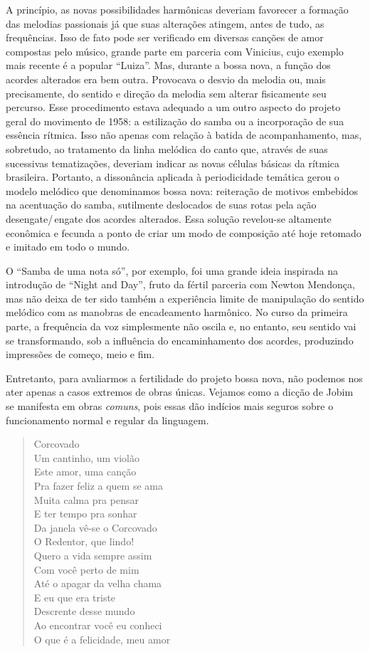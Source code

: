 A princípio, as novas possibilidades harmônicas deveriam favorecer a
formação das melodias passionais já que suas alterações atingem, antes
de tudo, as frequências. Isso de fato pode ser verificado em diversas
canções de amor compostas pelo músico, grande parte em parceria com
Vinicius, cujo exemplo mais recente é a popular ``Luiza''. Mas, durante a bossa nova, a função dos acordes alterados era
bem outra. Provocava o desvio da melodia ou, mais precisamente, do
sentido e direção da melodia sem alterar fisicamente seu percurso.
Esse procedimento estava adequado a um outro aspecto do projeto geral do
movimento de 1958: a estilização do samba ou a incorporação de sua
essência rítmica. Isso não apenas com relação à batida de
acompanhamento, mas, sobretudo, ao tratamento da linha melódica do canto
que, através de suas sucessivas tematizações, deveriam indicar as novas
células básicas da rítmica brasileira. Portanto, a dissonância aplicada
à periodicidade temática gerou o modelo melódico que denominamos bossa
nova: reiteração de motivos embebidos na acentuação do samba, sutilmente
deslocados de suas rotas pela ação desengate/\,engate dos acordes
alterados. Essa solução revelou-se altamente econômica e fecunda a ponto
de criar um modo de composição até hoje retomado e imitado em todo o
mundo.

O ``Samba de uma nota só'', por exemplo, foi uma grande ideia inspirada na
introdução de ``Night and Day'', fruto da fértil parceria com Newton
Mendonça, mas não deixa de ter sido também a experiência limite de
manipulação do sentido melódico com as manobras de encadeamento
harmônico. No curso da primeira parte, a frequência da voz simplesmente
não oscila e, no entanto, seu sentido vai se transformando, sob a
influência do encaminhamento dos acordes, produzindo impressões de
começo, meio e fim.

Entretanto, para avaliarmos a fertilidade do projeto bossa nova, não
podemos nos ater apenas a casos extremos de obras únicas. Vejamos como a
dicção de Jobim se manifesta em obras \textit{comuns}, pois essas dão
indícios mais seguros sobre o funcionamento normal e regular da
linguagem.

\begin{verse}
Corcovado\\
Um cantinho, um violão\\
Este amor, uma canção\\
Pra fazer feliz a quem se ama\\
Muita calma pra pensar\\
E ter tempo pra sonhar\\
Da janela vê-se o Corcovado\\
O Redentor, que lindo!\\
Quero a vida sempre assim\\
Com você perto de mim\\
Até o apagar da velha chama\\
E eu que era triste\\
Descrente desse mundo\\
Ao encontrar você eu conheci\\
O que é a felicidade, meu amor
\end{verse}


